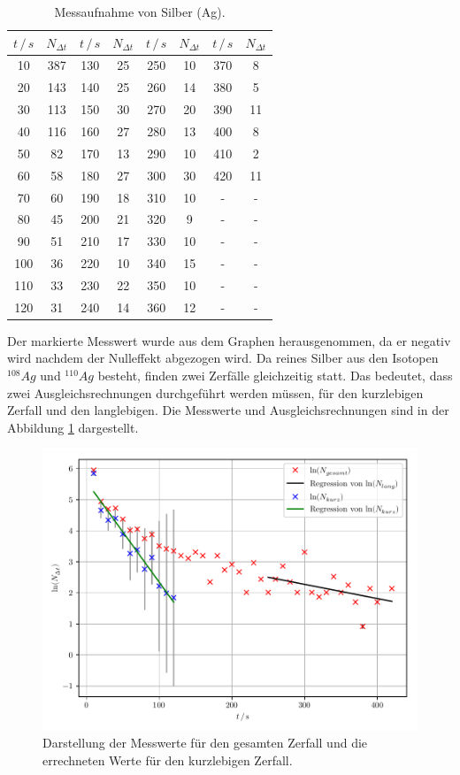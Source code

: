 \begin{table}[H]
  \centering
  \caption{Messaufnahme von Silber (Ag).}
  \label{tab:2}
  \begin{tabular}{c c c c c c c c}
    \toprule
    $t \, /\, s$& $N_{\Delta t}$& $t \, /\, s$& $N_{\Delta t}$ & $t \, /\, s$& $N_{\Delta t}$ & $t \, /\, s$& $N_{\Delta t}$ \\
    \midrule
    10 & 387 & 130 & 25 & 250 & 10 & 370 & 8\\
    20 & 143 & 140 & 25 & 260 & 14 & 380 & 5\\
    30 & 113 & 150 & 30 & 270 & 20 & 390 & 11\\
    40 & 116 & 160 & 27 & 280 & 13 & 400 & 8\\
    50 & 82 & 170 & 13 & 290 & 10 & 410 & \cellcolor{red}2\\
    60 & 58 & 180 & 27 & 300 & 30 & 420 & 11\\
    70 & 60 & 190 & 18 & 310 & 10 & -&-\\
    80 & 45 & 200 & 21 & 320 & 9 & -& - \\
    90 & 51 & 210 & 17 & 330 & 10 & -& -\\
    100 & 36 & 220 & 10 & 340 & 15 &- &-\\
    110 & 33 & 230 & 22 & 350 & 10 &- &-\\
    120 & 31 & 240 & 14 & 360 & 12 &- &-\\
    \bottomrule
  \end{tabular}
\end{table}

Der markierte Messwert wurde aus dem Graphen herausgenommen, da er negativ wird
nachdem der Nulleffekt abgezogen wird.
Da reines Silber aus den Isotopen $^108Ag$ und $^110Ag$ besteht, finden zwei Zerfälle
gleichzeitig statt. Das bedeutet, dass zwei Ausgleichsrechnungen
durchgeführt werden müssen, für den kurzlebigen Zerfall und den langlebigen.
Die Messwerte und Ausgleichsrechnungen sind in der Abbildung \ref{abb:4} dargestellt.

\begin{figure}[H]
  \centering
  \includegraphics{plot1.pdf}
  \caption{Darstellung der Messwerte für den gesamten Zerfall und die errechneten Werte
  für den kurzlebigen Zerfall.}
  \label{abb:4}
\end{figure}

